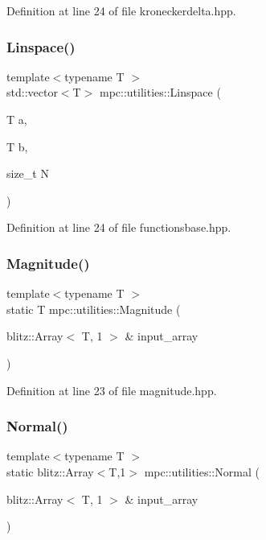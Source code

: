 Definition at line 24 of file kroneckerdelta.\+hpp.

\mbox{\label{namespacempc_1_1utilities_abb6b125ee38967fe00a7f47bf087b75a}} 
\subsubsection{\texorpdfstring{Linspace()}{Linspace()}}
{\footnotesize\ttfamily template$<$typename T $>$ \\
std\+::vector$<$T$>$ mpc\+::utilities\+::\+Linspace (\begin{DoxyParamCaption}\item[{T}]{a,  }\item[{T}]{b,  }\item[{size\+\_\+t}]{N }\end{DoxyParamCaption})}



Definition at line 24 of file functionsbase.\+hpp.

\mbox{\label{namespacempc_1_1utilities_a387fd6b2510b25009905e8121755c207}} 
\subsubsection{\texorpdfstring{Magnitude()}{Magnitude()}}
{\footnotesize\ttfamily template$<$typename T $>$ \\
static T mpc\+::utilities\+::\+Magnitude (\begin{DoxyParamCaption}\item[{blitz\+::\+Array$<$ T, 1 $>$ \&}]{input\+\_\+array }\end{DoxyParamCaption})\hspace{0.3cm}{\ttfamily [static]}}



Definition at line 23 of file magnitude.\+hpp.

\mbox{\label{namespacempc_1_1utilities_acc0a66ea58c515cc13d5a0a79439c639}} 
\subsubsection{\texorpdfstring{Normal()}{Normal()}}
{\footnotesize\ttfamily template$<$typename T $>$ \\
static blitz\+::\+Array$<$T,1$>$ mpc\+::utilities\+::\+Normal (\begin{DoxyParamCaption}\item[{blitz\+::\+Array$<$ T, 1 $>$ \&}]{input\+\_\+array }\end{DoxyParamCaption})\hspace{0.3cm}{\ttfamily [static]}}



